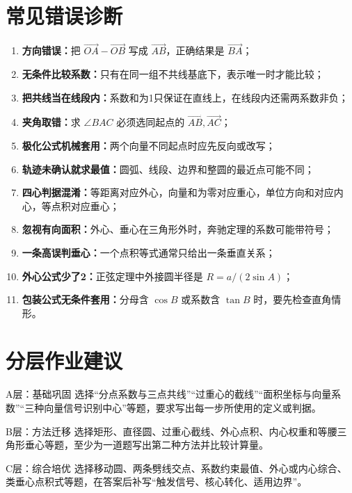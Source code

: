 \documentclass[11pt,a4paper,openany]{ctexbook}
\newcommand{\vect}[1]{\overrightarrow{#1}}
\begin{document}
\section{常见错误诊断}
\begin{warningbox}
\begin{enumerate}
  \item \textbf{方向错误：}把 \(\vect{OA}-\vect{OB}\) 写成 \(\vect{AB}\)，正确结果是 \(\vect{BA}\)；
  \item \textbf{无条件比较系数：}只有在同一组不共线基底下，表示唯一时才能比较；
  \item \textbf{把共线当在线段内：}系数和为1只保证在直线上，在线段内还需两系数非负；
  \item \textbf{夹角取错：}求 \(\angle BAC\) 必须选同起点的 \(\vect{AB},\vect{AC}\)；
  \item \textbf{极化公式机械套用：}两个向量不同起点时应先反向或改写；
  \item \textbf{轨迹未确认就求最值：}圆弧、线段、边界和整圆的最近点可能不同；
  \item \textbf{四心判据混淆：}等距离对应外心，向量和为零对应重心，单位方向和对应内心，等点积对应垂心；
  \item \textbf{忽视有向面积：}外心、垂心在三角形外时，奔驰定理的系数可能带符号；
  \item \textbf{一条高误判垂心：}一个点积等式通常只给出一条垂直关系；
  \item \textbf{外心公式少了2：}正弦定理中外接圆半径是 \(R=a/(2\sin A)\)；
  \item \textbf{包装公式无条件套用：}分母含 \(\cos B\) 或系数含 \(\tan B\) 时，要先检查直角情形。
\end{enumerate}
\end{warningbox}

\section{分层作业建议}
\begin{summarybox}{A层：基础巩固}
选择“分点系数与三点共线”“过重心的截线”“面积坐标与向量系数”“三种向量信号识别中心”等题，要求写出每一步所使用的定义或判据。
\end{summarybox}

\begin{summarybox}{B层：方法迁移}
选择矩形、直径圆、过重心截线、外心点积、内心权重和等腰三角形垂心等题，至少为一道题写出第二种方法并比较计算量。
\end{summarybox}

\begin{summarybox}{C层：综合培优}
选择移动圆、两条劈线交点、系数约束最值、外心或内心综合、类垂心点积式等题，在答案后补写“触发信号、核心转化、适用边界”。
\end{summarybox}
\end{document}

